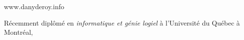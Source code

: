 \documentclass[11pt, letterpaper]{awesome-cv}
\begin{document}
\makecvheader

\makecvfooter
  {}
  {www.danyderoy.info}
  {}

\makelettertitle

\begin{cvletter}

Récemment diplômé en \emph{informatique et génie logiel} à l'Université du Québec à Montréal,





\end{cvletter}


\makeletterclosing
\end{document}
